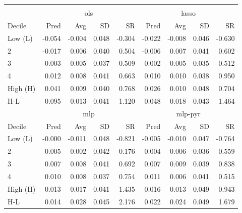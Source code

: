 \begin{tabular}{lrrrrrrrr}
\hline \hline \\ [-1.8ex]
 & \multicolumn{4}{c}{ols} & \multicolumn{4}{c}{lasso} \\
 \cmidrule(lr){2-5} \cmidrule(lr){6-9}
Decile & Pred & Avg & SD & SR & Pred & Avg & SD & SR \\
\midrule
Low (L) & -0.054 & -0.004 & 0.048 & -0.304 & -0.022 & -0.008 & 0.046 & -0.630 \\
2 & -0.017 & 0.006 & 0.040 & 0.504 & -0.006 & 0.007 & 0.041 & 0.602 \\
3 & -0.003 & 0.005 & 0.037 & 0.509 & 0.002 & 0.005 & 0.035 & 0.512 \\
4 & 0.012 & 0.008 & 0.041 & 0.663 & 0.010 & 0.010 & 0.038 & 0.950 \\
High (H) & 0.041 & 0.009 & 0.040 & 0.768 & 0.026 & 0.010 & 0.048 & 0.704 \\
H-L & 0.095 & 0.013 & 0.041 & 1.120 & 0.048 & 0.018 & 0.043 & 1.464 \\
\midrule
 & \multicolumn{4}{c}{mlp} & \multicolumn{4}{c}{mlp-pyr} \\
 \cmidrule(lr){2-5} \cmidrule(lr){6-9}
Decile & Pred & Avg & SD & SR & Pred & Avg & SD & SR \\
\midrule
Low (L) & -0.000 & -0.011 & 0.048 & -0.821 & -0.005 & -0.010 & 0.047 & -0.764 \\
2 & 0.005 & 0.002 & 0.042 & 0.176 & 0.004 & 0.006 & 0.036 & 0.559 \\
3 & 0.007 & 0.008 & 0.041 & 0.692 & 0.007 & 0.009 & 0.039 & 0.838 \\
4 & 0.010 & 0.008 & 0.037 & 0.754 & 0.011 & 0.006 & 0.041 & 0.515 \\
High (H) & 0.013 & 0.017 & 0.041 & 1.435 & 0.016 & 0.013 & 0.049 & 0.943 \\
H-L & 0.014 & 0.028 & 0.045 & 2.176 & 0.022 & 0.024 & 0.049 & 1.679 \\
\hline \hline
\end{tabular}